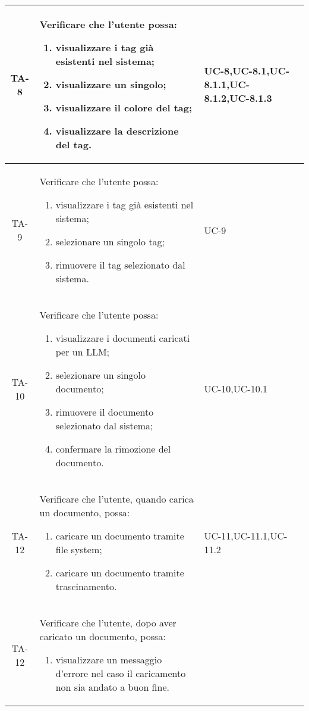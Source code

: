 \begin{xltabular}{\textwidth}{| c | X | X | c |}
    \hline
    TA-8 & Verificare che l’utente possa:
    \begin{enumerate}
        \item visualizzare i tag già esistenti nel sistema;
        \item visualizzare un singolo;
        \item visualizzare il colore del tag;
        \item visualizzare la descrizione del tag.
    \end{enumerate}& UC-8,\newline UC-8.1,\newline UC-8.1.1,\newline UC-8.1.2,\newline UC-8.1.3 & \textcolor{xmarkcolor}{} \\
    \hline
     TA-9 & Verificare che l’utente possa:
    \begin{enumerate}
        \item visualizzare i tag già esistenti nel sistema;
        \item selezionare un singolo tag;
        \item rimuovere il tag selezionato dal sistema.
        
    \end{enumerate}& UC-9 & \textcolor{xmarkcolor}{} \\
    \hline
     TA-10 & Verificare che l’utente possa:
    \begin{enumerate}
        \item visualizzare i documenti caricati per un LLM;
        \item selezionare un singolo documento;
        \item rimuovere il documento selezionato dal sistema;
        \item confermare la rimozione del documento.
        
    \end{enumerate}& UC-10,\newline UC-10.1 & \textcolor{xmarkcolor}{} \\
    \hline
    TA-12 & Verificare che l’utente, quando carica un documento, possa:
    \begin{enumerate}
        \item caricare un documento tramite file system;
        \item caricare un documento tramite trascinamento.
        
    \end{enumerate}& UC-11,\newline UC-11.1,\newline UC-11.2 & \textcolor{xmarkcolor}{} \\
    \hline
    TA-12 & Verificare che l’utente, dopo aver caricato un documento, possa:
    \begin{enumerate}
        \item visualizzare un messaggio d'errore nel caso il caricamento non sia andato a buon fine.
        

\end{enumerate}
\end{xltabular}
